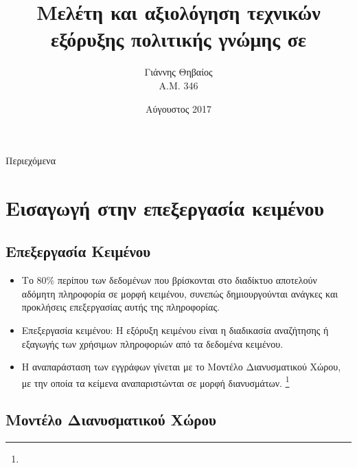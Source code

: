 \documentclass{beamer}
\title[Εξόρυξη πολιτικής γνώμης από {\latintext{tweets}}]{Μελέτη και αξιολόγηση τεχνικών εξόρυξης πολιτικής γνώμης σε {\latintext{tweets}}}
\author{Γιάννης Θηβαίος \\ Α.Μ. 346}
\date{Αύγουστος 2017}
\begin{document}
\begin{frame}

\titlepage %
\vfill
{}
\end{frame}

\begin{frame}{Περιεχόμενα}
\tableofcontents
\end{frame}

\section{Εισαγωγή στην επεξεργασία κειμένου}

\subsection{Επεξεργασία Κειμένου}

\begin{frame}
\begin{itemize}
\item Το 80$\%$ περίπου των δεδομένων που βρίσκονται στο διαδίκτυο αποτελούν αδόμητη πληροφορία σε μορφή κειμένου, συνεπώς δημιουργούνται ανάγκες και προκλήσεις επεξεργασίας αυτής της πληροφορίας.
\vfill
\item Επεξεργασία κειμένου: Η εξόρυξη κειμένου είναι η διαδικασία αναζήτησης ή εξαγωγής των χρήσιμων πληροφοριών από τα δεδομένα κειμένου.
\vfill
\item Η αναπαράσταση των εγγράφων γίνεται με το Μοντέλο Διανυσματικού Χώρου, με την οποία τα κείμενα αναπαριστώνται σε μορφή διανυσμάτων. \footnote{{}}
\vfill
\end{itemize}
\end{frame}

\subsection{Μοντέλο Διανυσματικού Χώρου}
\end{document}
